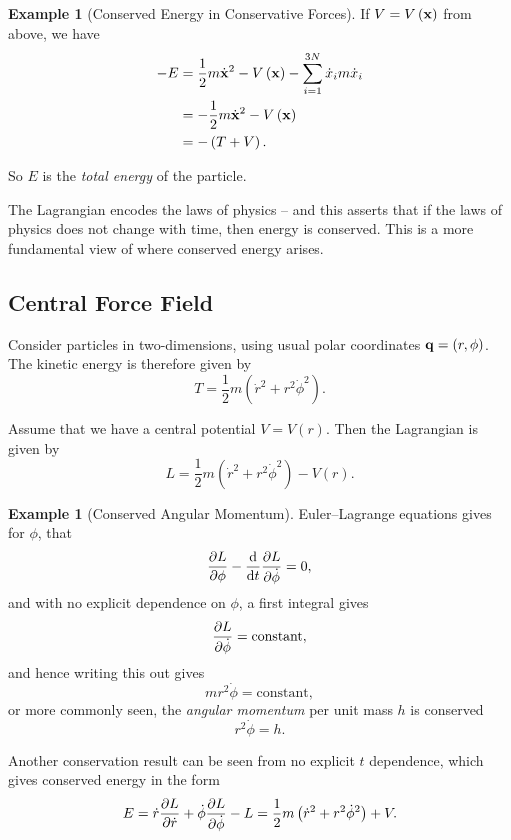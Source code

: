 \documentclass[11pt]{article}
\numberwithin{equation}{section}
\theoremstyle{definition}
\newtheorem{example}[theorem]{Example}
\theoremstyle{remark}
\newcommand{\pqty}[1]{\left(#1\right)}
\begin{document}
\begin{example}[Conserved Energy in Conservative Forces]\label{variation-unit-0062}
    If \(V = V\pqty{\vb{x}}\) from above, we have
    \begin{align*}
        -E &= \frac{1}{2} m \dot{\vb{x}}^2 - V\pqty{\vb{x}} - \sum_{i = 1}^{3N} \dot{x}_i m \dot{x}_i \\
        &= - \frac{1}{2} m \dot{\vb{x}}^2 - V\pqty{\vb{x}} \\
        &= - \pqty{T + V}.
    \end{align*}

    So \(E\) is the \emph{total energy} of the particle.
\end{example}

The Lagrangian encodes the laws of physics -- and this asserts that if the laws of physics does not change with time, then energy is conserved. This is a more fundamental view of where conserved energy arises.

\subsection{Central Force Field}

Consider particles in two-dimensions, using usual polar coordinates \(\vb{q} = \pqty{r, \phi}\). The kinetic energy is therefore given by
\[
    T = \frac{1}{2} m \pqty{\dot{r}^2 + r^2 \dot{\phi}^2}.
\]

Assume that we have a central potential \(V = V\pqty{r}\). Then the Lagrangian is given by
\[
    L = \frac{1}{2} m \pqty{\dot{r}^2 + r^2 \dot{\phi}^2} - V\pqty{r}.
\]

\begin{example}[Conserved Angular Momentum]\label{variation-unit-0063}
    Euler--Lagrange equations gives for \(\phi\), that
    \[
        \pdv{L}{\phi} - \dv{t} \pdv{L}{\dot{\phi}} = 0,
    \]
    and with no explicit dependence on \(\phi\), a first integral gives
    \[
        \pdv{L}{\dot{\phi}} = \text{constant},
    \]
    and hence writing this out gives
    \[
        m r^2 \dot{\phi} = \text{constant},
    \]
    or more commonly seen, the \emph{angular momentum} per unit mass \(h\) is conserved
    \[
        r^2 \dot{\phi} = h.
    \]
\end{example}

Another conservation result can be seen from no explicit \(t\) dependence, which gives conserved energy in the form
\[
    E = \dot{r} \pdv{L}{\dot{r}} + \dot{\phi} \pdv{L}{\dot{\phi}} - L = \frac{1}{2} m \pqty{\dot{r}^2 + r^2 \dot{\phi}^2} + V.
\]
\end{document}
